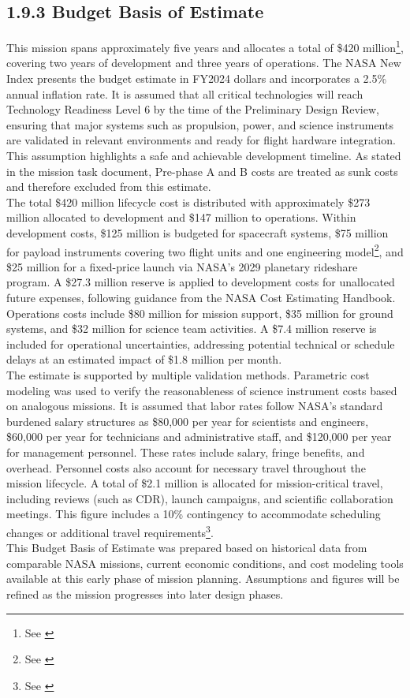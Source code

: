 \subsection*{1.9.3 Budget Basis of Estimate}

This mission spans approximately five years and allocates a total of \$420 million\footnote{See \cite{phoenix_cost}}, covering two years of development and three years of operations. The NASA New Index presents the budget estimate in FY2024 dollars and incorporates a 2.5\% annual inflation rate. It is assumed that all critical technologies will reach Technology Readiness Level 6 by the time of the Preliminary Design Review, ensuring that major systems such as propulsion, power, and science instruments are validated in relevant environments and ready for flight hardware integration. This assumption highlights a safe and achievable development timeline. As stated in the mission task document, Pre-phase A and B costs are treated as sunk costs and therefore excluded from this estimate.\\

The total \$420 million lifecycle cost is distributed with approximately \$273 million allocated to development and \$147 million to operations. Within development costs, \$125 million is budgeted for spacecraft systems, \$75 million for payload instruments covering two flight units and one engineering model\footnote{See \cite{mer_cost}}, and \$25 million for a fixed-price launch via NASA’s 2029 planetary rideshare program. A \$27.3 million reserve is applied to development costs for unallocated future expenses, following guidance from the NASA Cost Estimating Handbook. Operations costs include \$80 million for mission support, \$35 million for ground systems, and \$32 million for science team activities. A \$7.4 million reserve is included for operational uncertainties, addressing potential technical or schedule delays at an estimated impact of \$1.8 million per month.\\

The estimate is supported by multiple validation methods. Parametric cost modeling was used to verify the reasonableness of science instrument costs based on analogous missions. It is assumed that labor rates follow NASA's standard burdened salary structures as \$80,000 per year for scientists and engineers, \$60,000 per year for technicians and administrative staff, and \$120,000 per year for management personnel. These rates include salary, fringe benefits, and overhead. Personnel costs also account for necessary travel throughout the mission lifecycle. A total of \$2.1 million is allocated for mission-critical travel, including reviews (such as CDR), launch campaigns, and scientific collaboration meetings. This figure includes a 10\% contingency to accommodate scheduling changes or additional travel requirements\footnote{See \cite{phoenix_press_kit}}.\\

This Budget Basis of Estimate was prepared based on historical data from comparable NASA missions, current economic conditions, and cost modeling tools available at this early phase of mission planning. Assumptions and figures will be refined as the mission progresses into later design phases.